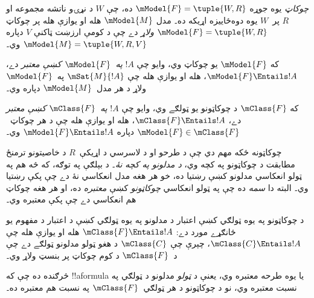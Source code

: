 \documentclass[../../../include/open-logic-section]{subfiles}
\begin{document}


\begin{defn}
  \emph{چوکاټ} يوه جوړه $\mModel{F} = \tuple{W,R}$ ده، چې $W$ د
  نړۍو ناتشه مجموعه او $R$ پر~$W$ يوه دوه‌ځاييزه اړيکه ده۔ مدل
  $\mModel{M}$ هله او يوازې هله پر چوکاټ $\mModel{F} = \tuple{W,R}$
  \emph{ولاړ} دے چې د کومې ارزښت ټاکنې $V$ دپاره
  $\mModel{M} = \tuple{W, R, V}$ وي۔
\end{defn}

\begin{defn}
  که $\mModel{F}$ يو چوکاټ وي، وايو چې $!A$
  \emph{په~$\mModel{F}$ کښې معتبر} دے، $\mModel{F} \Entails !A$،
  هله او يوازې هله چې $\mSat{M}{!A}$ په~$\mModel{F}$ ولاړ د هر مدل~$\mModel{M}$
  دپاره وي۔
  
  که $\mClass{F}$ د چوکاټونو يو ټولګے وي، وايو چې $!A$
  \emph{په~$\mClass{F}$ کښې معتبر} دے، $\mClass{F} \Entails !A$،
  هله او يوازې هله چې د هر چوکاټ~$\mModel{F} \in \mClass{F}$
  دپاره $\mModel{F} \Entails !A$ وي۔
\end{defn}

چوکاټونه ځکه مهم دي چې د طرحو او د لاسرسي د اړيکې~$R$ د خاصيتونو
ترمنځ مطابقت د چوکاټونو په کچه وي، \emph{د مدلونو په کچه نۀ}۔ د
بېلګې په توګه، که څه هم  په ټولو انعکاسي مدلونو کښې رښتيا ده،
خو هر هغه مدل انعکاسي نۀ دے چې  پکې رښتيا وي۔ البته دا
\emph{سمه} ده چې  په ټولو انعکاسي \emph{چوکاټونو} کښې
\emph{معتبره} ده، او هر هغه چوکاټ هم انعکاسي دے چې  پکې
معتبره وي۔

\begin{rem}
د چوکاټونو په يوه ټولګي کښې اعتبار د مدلونو په يوه ټولګي کښې د
اعتبار د مفهوم يو ځانګړے مورد دے: $\mClass{F} \Entails !A$ هله او
يوازې هله چې $\mClass{C} \Entails !A$، چېرې چې $\mClass{C}$ د هغو
ټولو مدلونو ټولګے دے چې د~$\mClass{F}$ د کوم چوکاټ پر بنسټ ولاړ وي۔

څرګنده ده چې که !!a{formula} يا يوه طرحه معتبره وي، يعنې د
\emph{ټولو} مدلونو د ټولګي په نسبت معتبره وي، نو د چوکاټونو د هر
ټولګي~$\mClass{F}$ په نسبت هم معتبره ده۔
\end{rem}
\end{document}
